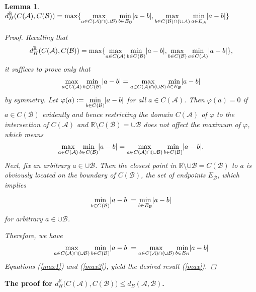 \documentclass[a4paper,12pt]{article}
\newtheorem{lemma}{Lemma}[section]
\DeclarePairedDelimiter{\abs}{\lvert}{\rvert}
\begin{document}
\begin{lemma} $\displaystyle d_H^\mathbb{R}(C(\mathcal{A}), C(\mathcal{B}))=\max\{\max_{a\in C(\mathcal{A})\cap (\cup \mathcal{B})}\min_{b\in E_\mathcal{B}} \abs{a-b}, \max_{b\in C(\mathcal{B})\cap (\cup \mathcal{A})}\min_{a\in E_\mathcal{A}}\abs{a-b}\}$
\begin{proof} Recalling that 
$$d_H^\mathbb{R}(C(\mathcal{A}), C(\mathcal{B}))=\max\{\max_{a\in C(\mathcal{A})}\min_{b\in C(\mathcal{B})}\abs{a-b}, \max_{b\in C(\mathcal{B})}\min_{a\in C(\mathcal{A})}\abs{a-b}\},$$
it suffices to prove only that
\begin{equation}\label{max}
\max_{a\in C(\mathcal{A})}\min_{b\in C(\mathcal{B})}\abs{a-b}=\max_{a\in C(\mathcal{A})\cap (\cup \mathcal{B})}\min_{b\in E_\mathcal{B}} \abs{a-b}
\end{equation}
by symmetry. Let $\displaystyle \varphi(a):=\min_{b\in C(\mathcal{B})}\abs{a-b}$ for all $a\in C(\mathcal{A})$. Then $\varphi(a)=0$ if $a\in C(\mathcal{B})$ evidently and hence restricting the domain $C(\mathcal{A})$ of $\varphi$ to the intersection of $C(\mathcal{A})$ and $\mathbb{R}\setminus C(\mathcal{B})=\cup \mathcal{B}$ does not affect the maximum of $\varphi$, which means
\begin{equation}\label{max1}
\max_{a\in C(\mathcal{A})}\min_{b\in C(\mathcal{B})}\abs{a-b}=\max_{a\in C(\mathcal{A})\cap (\cup\mathcal{B})}\min_{b\in C(\mathcal{B})}\abs{a-b}.
\end{equation}
Next, fix an arbitrary $a\in \cup \mathcal{B}$. Then the closest point in $\mathbb{R}\setminus \cup \mathcal{B}=C(\mathcal{B})$ to $a$ is obviously located on the boundary of $C(\mathcal{B})$, the set of endpoints $E_\mathcal{B}$, which implies 

\begin{equation*}
\min_{b\in C(\mathcal{B})}\abs{a-b}=\min_{b\in E_{\mathcal{B}}}\abs{a-b}
\end{equation*}
for arbitrary $a\in \cup \mathcal{B}$.

Therefore, we have
\begin{equation}\label{max2}
\max_{a\in C(\mathcal{A})\cap (\cup\mathcal{B})}\min_{b\in C(\mathcal{B})}\abs{a-b}=\max_{a\in C(\mathcal{A})\cap (\cup \mathcal{B})}\min_{b\in E_\mathcal{B}} \abs{a-b}
\end{equation}
Equations (\ref{max1}) and (\ref{max2}), yield the desired result (\ref{max}). 
\end{proof}
\end{lemma}

\textbf{The proof for $d_{H}^\mathbb{R}\big(C(\mathcal{A}) ,C(\mathcal{B})\big)\leq d_B(\mathcal{A}, \mathcal{B})$.}\\ 
\end{document}

